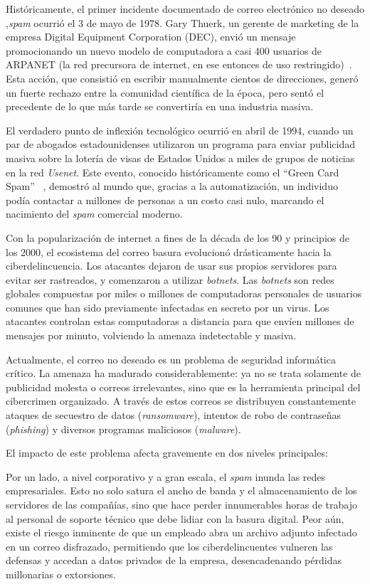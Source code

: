 \documentclass[a4paper,11pt]{book}
\begin{document}
Históricamente, el primer incidente documentado de correo electrónico no deseado ,\textit{spam} ocurrió el 3 de mayo de 1978. Gary Thuerk, un gerente de marketing de la empresa Digital Equipment Corporation (DEC), envió un mensaje promocionando un nuevo modelo de computadora a casi 400 usuarios de ARPANET (la red precursora de internet, en ese entonces de uso restringido)~\cite{templeton1978spam}. Esta acción, que consistió en escribir manualmente cientos de direcciones, generó un fuerte rechazo entre la comunidad científica de la época, pero sentó el precedente de lo que más tarde se convertiría en una industria masiva.

El verdadero punto de inflexión tecnológico ocurrió en abril de 1994, cuando un par de abogados estadounidenses utilizaron un programa para enviar publicidad masiva sobre la lotería de visas de Estados Unidos a miles de grupos de noticias en la red \textit{Usenet}. Este evento, conocido históricamente como el ``Green Card Spam'' ~\cite{wired1999greencard}, demostró al mundo que, gracias a la automatización, un individuo podía contactar a millones de personas a un costo casi nulo, marcando el nacimiento del \textit{spam} comercial moderno. 

Con la popularización de internet a fines de la década de los 90 y principios de los 2000, el ecosistema del correo basura evolucionó drásticamente hacia la ciberdelincuencia. Los atacantes dejaron de usar sus propios servidores para evitar ser rastreados, y comenzaron a utilizar \textit{botnets}. Las \textit{botnets} son redes globales compuestas por miles o millones de computadoras personales de usuarios comunes que han sido previamente infectadas en secreto por un virus. Los atacantes controlan estas computadoras  a distancia para que envíen millones de mensajes por minuto, volviendo la amenaza indetectable y masiva.

Actualmente, el correo no deseado es un problema de seguridad informática crítico. La amenaza ha madurado considerablemente: ya no se trata solamente de publicidad molesta o correos irrelevantes, sino que es la herramienta principal del cibercrimen organizado. A través de estos correos se distribuyen constantemente ataques de secuestro de datos (\textit{ransomware}), intentos de robo de contraseñas (\textit{phishing}) y diversos programas maliciosos (\textit{malware}).

El impacto de este problema afecta gravemente en dos niveles principales:

Por un lado, a nivel corporativo y a gran escala, el \textit{spam} inunda las redes empresariales. Esto no solo satura el ancho de banda y el almacenamiento de los servidores de las compañías, sino que hace perder innumerables horas de trabajo al personal de soporte técnico que debe lidiar con la basura digital. Peor aún, existe el riesgo inminente de que un empleado abra un archivo adjunto infectado en un correo disfrazado, permitiendo que los ciberdelincuentes vulneren las defensas y accedan a datos privados de la empresa, desencadenando pérdidas millonarias o extorsiones.
\end{document}

